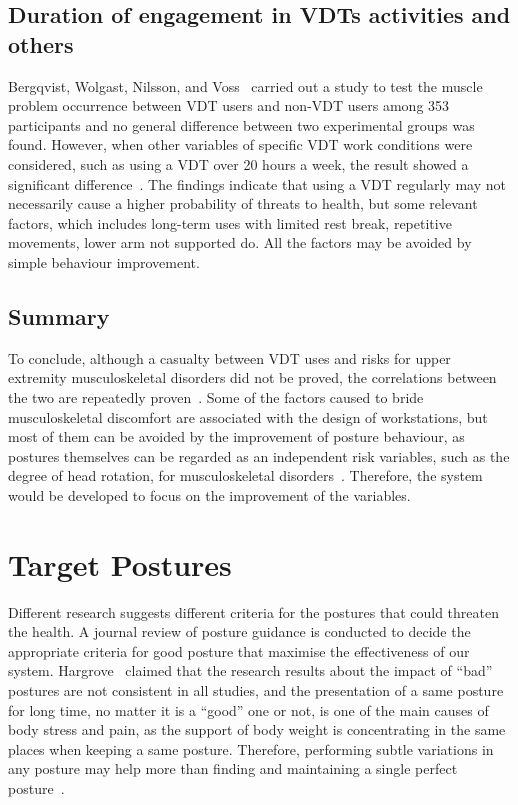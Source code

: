 \subsection{Duration of engagement in VDTs activities and others}
Bergqvist, Wolgast, Nilsson, and Voss~\cite{vdt_on_musculo_disorder} carried out a study to test the muscle problem occurrence between VDT users and non-VDT users among 353 participants and no general difference between two experimental groups was found. However, when other variables of specific VDT work conditions were considered, such as using a VDT over 20 hours a week, the result showed a significant difference~\cite{vdt_on_musculo_disorder}. The findings indicate that using a VDT regularly may not necessarily cause a higher probability of threats to health, but some relevant factors, which includes long-term uses with limited rest break, repetitive movements, lower arm not supported do. All the factors may be avoided by simple behaviour improvement.

\subsection{Summary}
To conclude, although a casualty between VDT uses and risks for upper extremity musculoskeletal disorders did not be proved, the correlations between the two are repeatedly proven~\cite{epid_musculo_disorder}. Some of the factors caused to bride musculoskeletal discomfort are associated with the design of workstations, but most of them can be avoided by the improvement of posture behaviour, as postures themselves can be regarded as an independent risk variables, such as the degree of head rotation, for musculoskeletal disorders~\cite{mindandmuscle_correct_posture}. Therefore, the system would be developed to focus on the improvement of the variables.

\section{Target Postures}
Different research suggests different criteria for the postures that could threaten the health. A journal review of posture guidance is conducted to decide the appropriate criteria for good posture that maximise the effectiveness of our system. Hargrove~\cite{bad_posture_back_pain} claimed that the research results about the impact of “bad” postures are not consistent in all studies, and the presentation of a same posture for long time, no matter it is a ``good'' one or not, is one of the main causes of body stress and pain, as the support of body weight is concentrating in the same places when keeping a same posture. Therefore, performing subtle variations in any posture may help more than finding and maintaining a single perfect posture~\cite{bad_posture_back_pain}.


